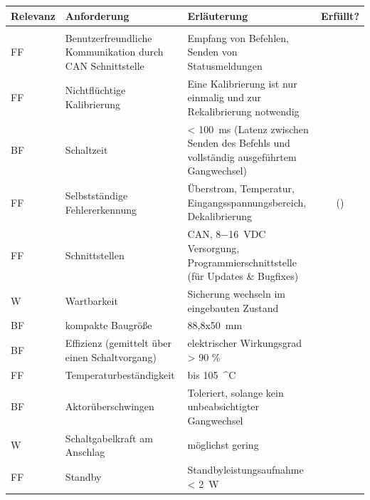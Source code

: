 \begin{table}[h]
	\centering
		\begin{tabular}{l|p{5cm}|p{7cm}|c}
			\textbf{Relevanz} & \textbf{Anforderung} & \textbf{Erläuterung} & Erfüllt?\\ \hline
			& &\\
			FF & Benutzerfreundliche Kommunikation durch CAN Schnittstelle & Empfang von Befehlen, Senden von Statusmeldungen & \checkmark\\ \hline
			FF & Nichtflüchtige Kalibrierung & Eine Kalibrierung ist nur einmalig und zur Rekalibrierung notwendig& \checkmark\\ \hline
			BF & Schaltzeit & < \SI{100}{ms} (Latenz zwischen Senden des Befehls und vollständig ausgeführtem Gangwechsel)& \checkmark\\ \hline
			FF & Selbstständige Fehlererkennung & Überstrom, Temperatur, Eingangsspannungsbereich, Dekalibrierung& (\checkmark) \\ \hline
			FF & Schnittstellen & CAN, \SI{8-16}{VDC} Versorgung, Programmierschnittstelle (für Updates \& Bugfixes)& \checkmark \\ \hline
			W & Wartbarkeit & Sicherung wechseln im eingebauten Zustand& \checkmark\\ \hline
			BF & kompakte Baugröße & 88,8x\SI{50}{mm}&\checkmark \\ \hline
			BF & Effizienz (gemittelt über einen Schaltvorgang) & elektrischer Wirkungsgrad > 90 \% & \\ \hline
			FF & Temperaturbeständigkeit & bis \SI{105}{^\circ C}& \checkmark \\ \hline
			BF & Aktorüberschwingen & Toleriert, solange kein unbeabsichtigter Gangwechsel& \checkmark
			\\ \hline
			W & Schaltgabelkraft am Anschlag & möglichst gering& \checkmark \\ \hline
			FF & Standby & Standbyleistungsaufnahme < \SI{2}{W}& \checkmark \\ \hline
		\end{tabular}
	\label{tab:Anforderungsliste2}
\end{table}

